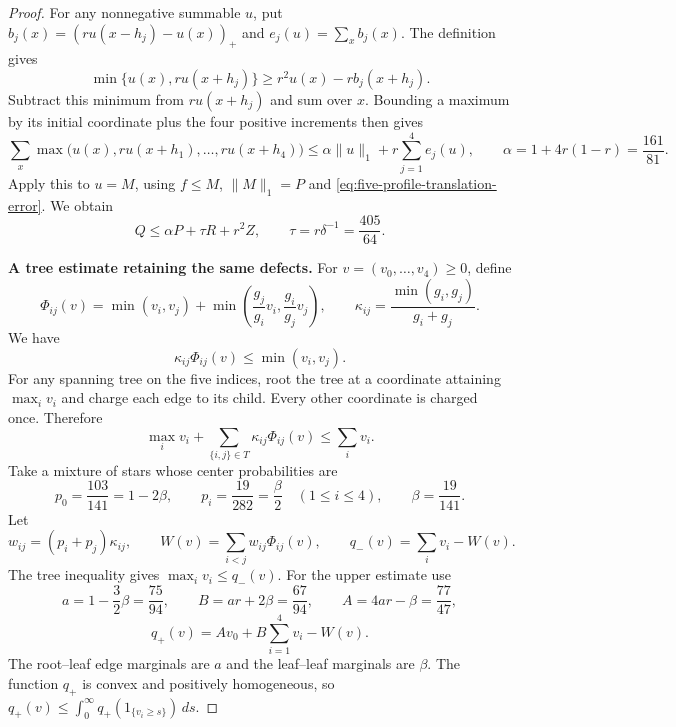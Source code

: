 \begin{proof}
For any nonnegative summable $u$, put
$b_j(x)=(r u(x-h_j)-u(x))_+$ and $e_j(u)=\sum_x b_j(x)$.
The definition gives
\[
 \min\{u(x),r u(x+h_j)\}
 \ge r^2u(x)-r b_j(x+h_j).
\]
Subtract this minimum from $r u(x+h_j)$ and sum over $x$.
Bounding a maximum by its initial coordinate plus the four positive
increments then gives
\[
 \sum_x\max\bigl(u(x),r u(x+h_1),\ldots,r u(x+h_4)\bigr)
 \le \alpha\|u\|_1+r\sum_{j=1}^4e_j(u),
 \qquad
 \alpha=1+4r(1-r)=\frac{161}{81}.
\]
Apply this to $u=M$, using $f\le M$, $\|M\|_1=P$ and
\eqref{eq:five-profile-translation-error}.  We obtain
\begin{equation}\label{eq:five-profile-stability}
 Q\le\alpha P+\tau R+r^2Z,\qquad
 \tau=r\delta^{-1}=\frac{405}{64}.
\end{equation}

\medskip\noindent\textbf{A tree estimate retaining the same defects.}
For $v=(v_0,\ldots,v_4)\ge0$, define
\[
 \Phi_{ij}(v)=\min(v_i,v_j)
 +\min\left(\frac{g_j}{g_i}v_i,\frac{g_i}{g_j}v_j\right),
 \qquad
 \kappa_{ij}=\frac{\min(g_i,g_j)}{g_i+g_j}.
\]
We have
\[
 \kappa_{ij}\Phi_{ij}(v)\le\min(v_i,v_j).
\]
For any spanning tree on the five indices, root the tree at a
coordinate attaining $\max_i v_i$ and charge each edge to its child.
Every other coordinate is charged once.  Therefore
\[
 \max_i v_i+\sum_{\{i,j\}\in T}\kappa_{ij}\Phi_{ij}(v)
 \le\sum_i v_i.
\]
Take a mixture of stars whose center probabilities are
\[
 p_0=\frac{103}{141}=1-2\beta,\qquad
 p_i=\frac{19}{282}=\frac{\beta}{2}\quad(1\le i\le4),
 \qquad\beta=\frac{19}{141}.
\]
Let
\[
 w_{ij}=(p_i+p_j)\kappa_{ij},\qquad
 W(v)=\sum_{i<j}w_{ij}\Phi_{ij}(v),\qquad
 q_-(v)=\sum_i v_i-W(v).
\]
The tree inequality gives $\max_i v_i\le q_-(v)$.
For the upper estimate use
\[
 a=1-\frac32\beta=\frac{75}{94},\qquad
 B=ar+2\beta=\frac{67}{94},\qquad
 A=4ar-\beta=\frac{77}{47},
\]
\[
 q_+(v)=Av_0+B\sum_{i=1}^4v_i-W(v).
\]
The root--leaf edge marginals are $a$ and the leaf--leaf marginals
are $\beta$.  The function $q_+$ is convex and positively
homogeneous, so
$q_+(v)\le\int_0^\infty q_+(1_{\{v_i\ge s\}})\,ds$.


\end{proof}
